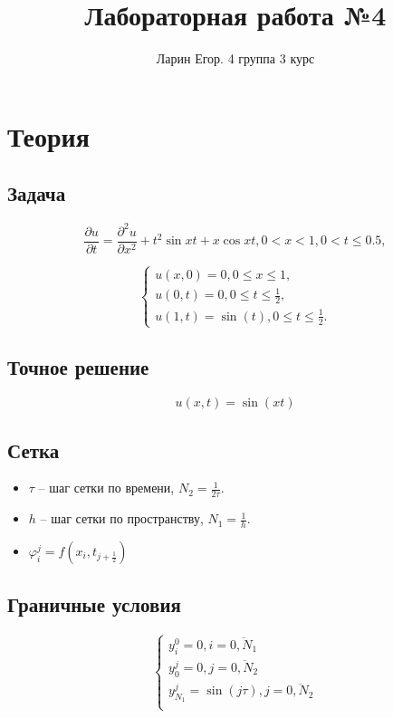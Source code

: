 \documentclass{article}
\title{Лабораторная работа №4}
\author{Ларин Егор. 4 группа 3 курс}
\begin{document}
\maketitle
\section*{Теория}
\subsection*{Задача}
\begin{equation*}
    \frac{\partial u}{\partial t} = \frac{\partial ^2u}{\partial x^2} +t^2 \sin xt + x \cos xt, 0 < x <1, 0< t\leq0.5,
\end{equation*}

$$\begin{cases}
    u(x,0) = 0, 0\leq x \leq 1,\\
    u(0,t) = 0, 0\leq t \leq \frac{1}{2},\\
    u(1,t) = \sin(t), 0\leq t \leq \frac{1}{2}.
\end{cases}$$

\subsection*{Точное решение}
\begin{equation}
    u(x,t)  = \sin(x t)
\end{equation}

\subsection*{Сетка}
\begin{itemize}
    \item $\tau$ -- шаг сетки по времени, $N_2 = \frac{1}{2\tau}$.
    \item $h$ -- шаг сетки по пространству, $N_1 = \frac{1}{h}$.
    \item $\varphi_i^j = f(x_i, t_{j+\frac{1}{2}})$
\end{itemize}

\subsection*{Граничные условия}
$$\begin{cases}
    y_{i}^0 = 0, i = \overline{0, N_1}\\
    y_{0}^j = 0, j = \overline{0, N_2}\\
    y_{N_1}^j = \sin (j\tau), j = \overline{0, N_2}\\
\end{cases}$$
\end{document}
